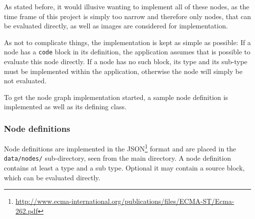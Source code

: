 \documentclass[10pt, openright, notitlepage]{scrreprt}
\begin{document}
As stated before, it would illusive wanting to implement all of these nodes, as
the time frame of this project is simply too narrow and therefore only nodes,
that can be evaluated directly, as well as images are considered for
implementation.

As not to complicate things, the implementation is kept as simple as
possible: If a node has a \texttt{code} block in its definition, the application
assumes that is possible to evaluate this node directly. If a node has no such
block, its type and its sub-type must be implemented within the application,
otherwise the node will simply be not evaluated.

To get the node graph implementation started, a sample node definition is
implemented as well as its defining class.

\subsubsection{Node definitions}
\label{sec:orgb8191fd}

Node definitions are implemented in the
JSON\footnote{\url{http://www.ecma-international.org/publications/files/ECMA-ST/Ecma-262.pdf}}
format and are placed in the \texttt{data/nodes/} sub-directory, seen from the main
directory. A node definition contains at least a type and a sub type. Optional
it may contain a source block, which can be evaluated directly.
\end{document}
